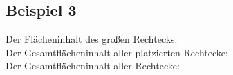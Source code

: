 \subsection{Beispiel 3}\label{ex:3}
Der Flächeninhalt des großen Rechtecks: \\
Der Gesamtflächeninhalt aller platzierten Rechtecke: \\
Der Gesamtflächeninhalt aller Rechtecke: 